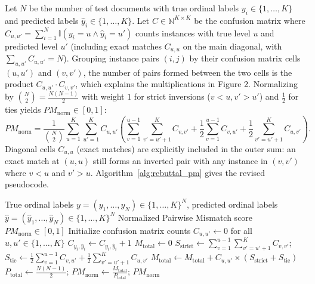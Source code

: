 \documentclass[11pt,a4paper]{article}
\begin{document}
Let $N$ be the number of test documents with true ordinal labels $y_i \in \{1, \dots, K\}$ and predicted labels $\hat{y}_i \in \{1, \dots, K\}$. Let $C \in \mathbb{N}^{K \times K}$ be the confusion matrix where $C_{u,u'} = \sum_{i=1}^N \mathbb{I}(y_i = u \land \hat{y}_i = u')$ counts instances with true level $u$ and predicted level $u'$ (including exact matches $C_{u,u}$ on the main diagonal, with $\sum_{u,u'} C_{u,u'} = N$). Grouping instance pairs $(i, j)$ by their confusion matrix cells $(u, u')$ and $(v, v')$, the number of pairs formed between the two cells is the product $C_{u,u'} \cdot C_{v,v'}$, which explains the multiplications in Figure 2. Normalizing by $\binom{N}{2} = \frac{N(N-1)}{2}$ with weight $1$ for strict inversions ($v < u, v' > u'$) and $\frac{1}{2}$ for ties yields $PM_{\text{norm}} \in [0, 1]$:
\begin{equation}
PM_{\text{norm}} = \frac{1}{\binom{N}{2}} \sum_{u=1}^{K} \sum_{u'=1}^{K} C_{u,u'} \left( \sum_{v=1}^{u-1} \sum_{v'=u'+1}^{K} C_{v,v'} + \frac{1}{2} \sum_{v=1}^{u-1} C_{v,u'} + \frac{1}{2} \sum_{v'=u'+1}^{K} C_{u,v'} \right).
\label{eq:rebuttal_pm_norm}
\end{equation}
Diagonal cells $C_{u,u}$ (exact matches) are explicitly included in the outer sum: an exact match at $(u, u)$ still forms an inverted pair with any instance in $(v, v')$ where $v < u$ and $v' > u$. Algorithm~\ref{alg:rebuttal_pm} gives the revised pseudocode.

\begin{algorithm}[!htbp]
\caption{Normalized Pairwise Mismatch ($PM_{\text{norm}}$) Computation via Confusion Matrix Counts}
\label{alg:rebuttal_pm}
\footnotesize
\begin{algorithmic}[1]
\Require True ordinal labels $y = (y_1, \dots, y_N) \in \{1, \dots, K\}^N$, predicted ordinal labels $\hat{y} = (\hat{y}_1, \dots, \hat{y}_N) \in \{1, \dots, K\}^N$
\Ensure Normalized Pairwise Mismatch score $PM_{\text{norm}} \in [0, 1]$
\State Initialize confusion matrix counts $C_{u,u'} \gets 0$ for all $u, u' \in \{1, \dots, K\}$ 
 $C_{y_i, \hat{y}_i} \gets C_{y_i, \hat{y}_i} + 1$ \EndFor
\State $M_{\text{total}} \gets 0$ 
            \State $S_{\text{strict}} \gets \sum_{v=1}^{u-1} \sum_{v'=u'+1}^{K} C_{v,v'}$; \quad $S_{\text{tie}} \gets \frac{1}{2} \sum_{v=1}^{u-1} C_{v,u'} + \frac{1}{2} \sum_{v'=u'+1}^{K} C_{u,v'}$
            \State $M_{\text{total}} \gets M_{\text{total}} + C_{u,u'} \times \left( S_{\text{strict}} + S_{\text{tie}} \right)$
        \EndIf
    \EndFor
\EndFor
\State $P_{\text{total}} \gets \frac{N(N - 1)}{2}$; \quad $PM_{\text{norm}} \gets \frac{M_{\text{total}}}{P_{\text{total}}}$; \quad \Return $PM_{\text{norm}}$
\end{algorithmic}
\end{algorithm}
\end{document}

